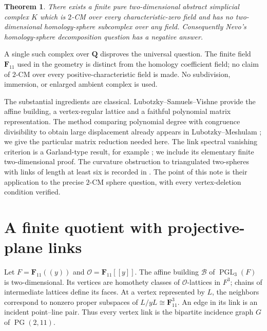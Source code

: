\documentclass[10pt]{article}
\newtheorem{theorem}{Theorem}
\newcommand{\F}{\mathbf F}
\newcommand{\Q}{\mathbf Q}
\newcommand{\PGL}{\operatorname{PGL}}
\newcommand{\PG}{\operatorname{PG}}
\begin{document}
\begin{theorem}\label{thm:main}
There exists a finite pure two-dimensional abstract simplicial complex $K$
which is $2$-CM over every characteristic-zero field and has no
two-dimensional homology-sphere subcomplex over any field.
Consequently Nevo's homology-sphere decomposition question has a negative answer.
\end{theorem}

A single such complex over $\Q$ disproves the universal question. The finite
field $\F_{11}$ used in the geometry is distinct from the homology coefficient
field; no claim of $2$-CM over every positive-characteristic field is made.
No subdivision, immersion, or enlarged ambient complex is used.

The substantial ingredients are classical. Lubotzky--Samuels--Vishne
\cite[Sections~2--4]{LSV} provide the affine building, a vertex-regular lattice
and a faithful polynomial matrix representation. The method comparing polynomial
degree with congruence divisibility to obtain large displacement already appears in
Lubotzky--Meshulam \cite[Proposition~3.3]{LM}; we give the particular matrix
reduction needed here. The link spectral vanishing criterion is a
Garland-type result, for example \cite[Theorem~1]{BS}; we include its elementary
finite two-dimensional proof. The curvature obstruction to triangulated
two-spheres with links of length at least six is recorded in
\cite[Example~1.8(5)]{JS}. The point of this note is their application to the
precise $2$-CM sphere question, with every vertex-deletion condition verified.

\section{A finite quotient with projective-plane links}
Let $F=\F_{11}((y))$ and $\mathcal O=\F_{11}[[y]]$. The affine building
$\mathcal B$ of $\PGL_3(F)$ is two-dimensional. Its vertices are homothety
classes of $\mathcal O$-lattices in $F^3$; chains of intermediate lattices define
its faces. At a vertex represented by $L$, the neighbors correspond to
nonzero proper subspaces of $L/yL\cong\F_{11}^3$. An edge in its link is an
incident point--line pair. Thus every vertex link is the bipartite incidence
graph $G$ of $\PG(2,11)$.
\end{document}
